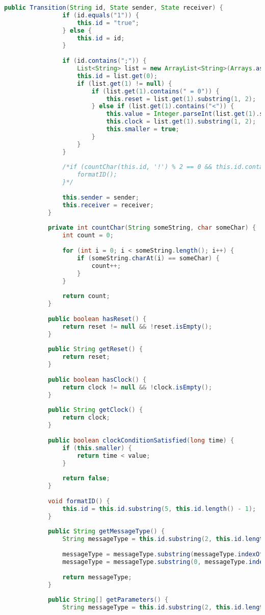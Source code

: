 \begin{lstlisting}[language=java, caption={példa unit teszteset.},captionpos=b]
			public Transition(String id, State sender, State receiver) {
				if (id.equals("1")) {
					this.id = "true";
				} else {
					this.id = id;
				}
				
				if (id.contains(";")) {
					List<String> list = new ArrayList<String>(Arrays.asList(id.split(";")));
					this.id = list.get(0);
					if (list.get(1) != null) {
						if (list.get(1).contains(" = 0")) {
							this.reset = list.get(1).substring(1, 2);
						} else if (list.get(1).contains("<")) {
							this.value = Integer.parseInt(list.get(1).substring(list.get(1).length() - 2, list.get(1).length())) * 1000000000;
							this.clock = list.get(1).substring(1, 2);
							this.smaller = true;
						}
					}
				}
				
				/*if (countChar(this.id, '!') % 2 == 0 && this.id.contains("!")) {
					formatID();
				}*/
				
				this.sender = sender;
				this.receiver = receiver;
			}
			
			private int countChar(String someString, char someChar) {
				int count = 0;
				 
				for (int i = 0; i < someString.length(); i++) {
					if (someString.charAt(i) == someChar) {
						count++;
					}
				}
				
				return count;
			}
			
			public boolean hasReset() {
				return reset != null && !reset.isEmpty();
			}
			
			public String getReset() {
				return reset;
			}
			
			public boolean hasClock() {
				return clock != null && !clock.isEmpty();
			}
			
			public String getClock() {
				return clock;
			}
			
			public boolean clockConditionSatisfied(long time) {
				if (this.smaller) {
					return time < value;
				}
				
				return false;
			}
			
			void formatID() {
				this.id = this.id.substring(5, this.id.length() - 1);
			}
			
			public String getMessageType() {
				String messageType = this.id.substring(2, this.id.length() - 1);
		 
				messageType = messageType.substring(messageType.indexOf(".") + 1);
				messageType = messageType.substring(0, messageType.indexOf("("));
		
				return messageType;
			}
			
			public String[] getParameters() {
				String messageType = this.id.substring(2, this.id.length() - 1);
				 

\end{lstlisting}
